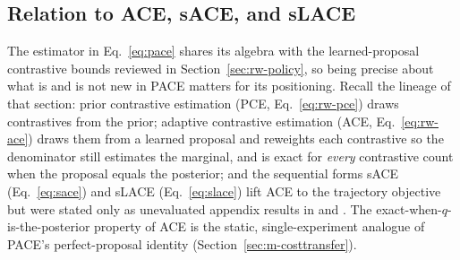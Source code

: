 \subsection{Relation to ACE, sACE, and sLACE}
\label{sec:m-relation}

The estimator in Eq.~\eqref{eq:pace} shares its algebra with the learned-proposal
contrastive bounds reviewed in Section~\ref{sec:rw-policy}, so being precise about what is
and is not new in PACE matters for its positioning. Recall the lineage of that section:
prior contrastive estimation (PCE, Eq.~\eqref{eq:rw-pce}) draws contrastives from the prior;
adaptive contrastive estimation (ACE, Eq.~\eqref{eq:rw-ace}) draws them from a learned
proposal and reweights each contrastive so the denominator still estimates the marginal,
and is exact for \emph{every} contrastive count when the proposal equals the posterior; and
the sequential forms sACE (Eq.~\eqref{eq:sace}) and sLACE (Eq.~\eqref{eq:slace}) lift ACE to
the trajectory objective but were stated only as unevaluated appendix results in
\citet{foster2021deep} and \citet{ivanova2021implicit}. The exact-when-$q$-is-the-posterior
property of ACE is the static, single-experiment analogue of PACE's perfect-proposal
identity (Section~\ref{sec:m-costtransfer}).

